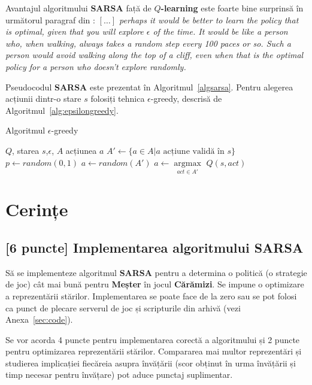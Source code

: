 \documentclass[12pt]{article}
\newcommand{\sarsa}{{\color{blue(pigment)} \textbf{SARSA}}}
\newcommand{\qlearn}{{\color{blue(pigment)} $Q$\textbf{-learning}}}
\newcommand{\caramizi}{{\color{darkygray} \textbf{Cărămizi}}}
\begin{document}
Avantajul algoritmului \sarsa{} față de \qlearn{} este foarte bine
surprinsă în următorul paragraf din \citep{baird1999reinforcement}:
\emph{$[\ldots]$ perhaps it would be better to learn the policy that
  is optimal, given that you will explore $\epsilon$ of the time. It
  would be like a person who, when walking, always takes a random step
  every 100 paces or so. Such a person would avoid walking along the
  top of a cliff, even when that is the optimal policy for a person
  who doesn't explore randomly.}

Pseudocodul \sarsa{} este prezentat în
Algoritmul~\ref{algsarsa}. Pentru alegerea acțiunii dintr-o stare $s$
folosiți tehnica $\epsilon$-greedy, descrisă de
Algoritmul~\ref{alg:epsilongreedy}.

\begin{algorithm}
  \caption{Algoritmul $\epsilon$-greedy}
  \begin{algorithmic}[1]
    \REQUIRE $Q$, starea $s$,$\epsilon$, $A$ \ENSURE acțiunea $a$
    \STATE $A' \longleftarrow \lbrace a \in A \vert a \text{ acțiune
      validă în } s \rbrace$ \STATE $p \longleftarrow random(0,1)$
     \STATE $a \longleftarrow random(A')$ \ELSE
    \STATE $a \longleftarrow \underset{act \in
      A'}{\operatorname{argmax}}$ $Q(s,act)$
    \ENDIF
  \end{algorithmic}
  \label{alg:epsilongreedy}
\end{algorithm}

\section{Cerințe}
\label{sec:tasks}

\subsection*{[6 puncte] Implementarea algoritmului \sarsa{}}
\label{sec:sarsa}

Să se implementeze algoritmul \sarsa{} pentru a determina o politică
(o strategie de joc) cât mai bună pentru \textbf{Meșter} în jocul
\caramizi. Se impune o optimizare a reprezentării
stărilor. Implementarea se poate face de la zero sau se pot folosi ca
punct de plecare serverul de joc și scripturile din arhivă (vezi
Anexa~\ref{sec:code}).

Se vor acorda 4 puncte pentru implementarea corectă a algoritmului și
2 puncte pentru optimizarea reprezentării stărilor. Compararea mai
multor reprezentări și studierea implicației fiecăreia asupra
învățării (scor obținut în urma învățării și timp necesar pentru
învățare) pot aduce punctaj suplimentar.
\end{document}
